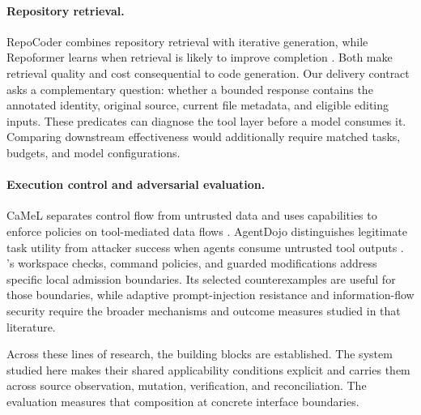 \paragraph{Repository retrieval.}
RepoCoder combines repository retrieval with iterative generation, while Repoformer learns when retrieval is likely to improve completion \cite{zhang2023repocoder,wu2024repoformer}. Both make retrieval quality and cost consequential to code generation. Our delivery contract asks a complementary question: whether a bounded response contains the annotated identity, original source, current file metadata, and eligible editing inputs. These predicates can diagnose the tool layer before a model consumes it. Comparing downstream effectiveness would additionally require matched tasks, budgets, and model configurations.

\paragraph{Execution control and adversarial evaluation.}
CaMeL separates control flow from untrusted data and uses capabilities to enforce policies on tool-mediated data flows \cite{debenedetti2025camel}. AgentDojo distinguishes legitimate task utility from attacker success when agents consume untrusted tool outputs \cite{debenedetti2024agentdojo}. \wcode{}'s workspace checks, command policies, and guarded modifications address specific local admission boundaries. Its selected counterexamples are useful for those boundaries, while adaptive prompt-injection resistance and information-flow security require the broader mechanisms and outcome measures studied in that literature.

Across these lines of research, the building blocks are established. The system studied here makes their shared applicability conditions explicit and carries them across source observation, mutation, verification, and reconciliation. The evaluation measures that composition at concrete interface boundaries.

